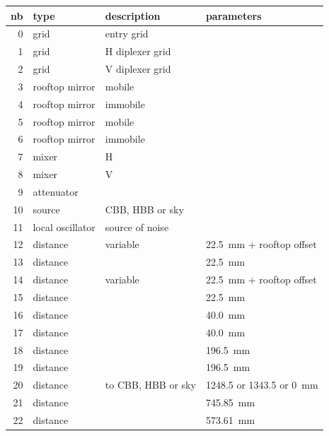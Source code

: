 \begin{table}[hbtp]
    \begin{tabular}{rlll}
        \toprule
        nb & type & description & parameters \\
        \midrule
         0 & grid             & entry grid                      & \\
         1 & grid             & H diplexer grid                 & \\
         2 & grid             & V diplexer grid                 & \\
         3 & rooftop mirror   & mobile                          & \\
         4 & rooftop mirror   & immobile                        & \\
         5 & rooftop mirror   & mobile                          & \\
         6 & rooftop mirror   & immobile                        & \\
         7 & mixer            & H                               & \\
         8 & mixer            & V                               & \\
         9 & attenuator       &                                 & \\
        10 & source           & CBB, HBB or sky  & \\
        11 & local oscillator & source of noise                 & \\
        12 & distance         & variable       & \SI{22.5}{\milli\meter} + rooftop offset  \\
        13 & distance         &                                 & \SI{22.5}{\milli\meter}           \\
        14 & distance         & variable       & \SI{22.5}{\milli\meter} + rooftop offset  \\
        15 & distance         &                                 & \SI{22.5}{\milli\meter}           \\
        16 & distance         &                                 & \SI{40.0}{\milli\meter}           \\
        17 & distance         &                                 & \SI{40.0}{\milli\meter}           \\
        18 & distance         &                                 & \SI{196.5}{\milli\meter}          \\
        19 & distance         &                                 & \SI{196.5}{\milli\meter}          \\
        20 & distance         & to CBB, HBB or sky              & 1248.5 or 1343.5 or \SI{0}{\milli\meter} \\
        21 & distance         &                                 & \SI{745.85}{\milli\meter} \\
        22 & distance         &                                 & \SI{573.61}{\milli\meter} \\
        \bottomrule
    \end{tabular}
\end{table}

